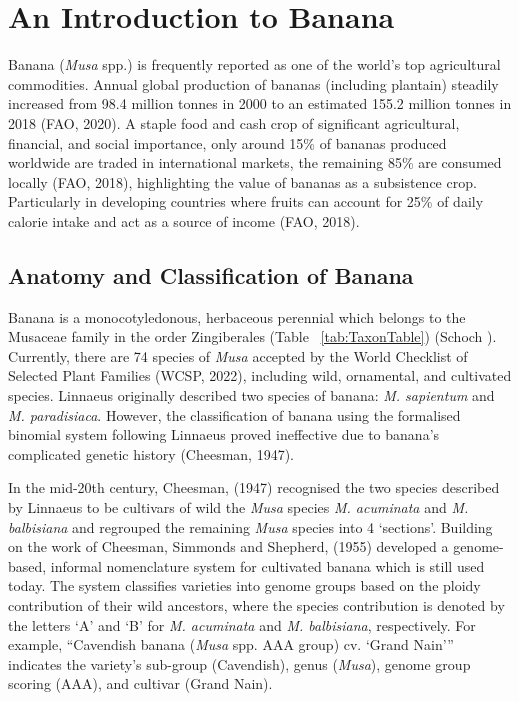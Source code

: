 \section {An Introduction to Banana}

Banana (\textit{Musa} spp.) is frequently reported as one of the world’s top agricultural commodities. Annual global production of bananas (including plantain) steadily increased from 98.4 million tonnes in 2000 to an estimated 155.2 million tonnes in 2018 (\ac{FAO}, 2020). A staple food and cash crop of significant agricultural, financial, and social importance, only around 15\% of bananas produced worldwide are traded in international markets, the remaining 85\% are consumed locally (\ac{FAO}, 2018), highlighting the value of bananas as a subsistence crop. Particularly in developing countries where fruits can account for 25\% of daily calorie intake and act as a source of income (\ac{FAO}, 2018).

\subsection{Anatomy and Classification of Banana}  

Banana is a monocotyledonous, herbaceous perennial which belongs to the Musaceae family in the order Zingiberales (Table ~\ref{tab:TaxonTable}) (Schoch ). Currently, there are 74 species of \textit{Musa} accepted by the World Checklist of Selected Plant Families (WCSP, 2022), including wild, ornamental, and cultivated species. Linnaeus originally described two species of banana: \textit{M. sapientum }and \textit{M. paradisiaca}. However, the classification of banana using the formalised binomial system following Linnaeus proved ineffective due to banana’s complicated genetic history (Cheesman, 1947).  



In the mid-20th century, Cheesman, (1947) recognised the two species described by Linnaeus to be cultivars of wild the \textit{Musa} species \textit{M. acuminata }and \textit{M. balbisiana} and regrouped the remaining \textit{Musa} species into 4 ‘sections’. Building on the work of Cheesman, Simmonds and Shepherd, (1955) developed a genome-based, informal nomenclature system for cultivated banana which is still used today. The system classifies varieties into genome groups based on the ploidy contribution of their wild ancestors, where the species contribution is denoted by the letters ‘A’ and ‘B’ for \textit{M. acuminata} and \textit{M. balbisiana}, respectively. For example, “Cavendish banana (\textit{Musa }spp. AAA group) cv. ‘Grand Nain’” indicates the variety’s sub-group (Cavendish), genus (\textit{Musa}), genome group scoring (AAA), and cultivar (Grand Nain).

